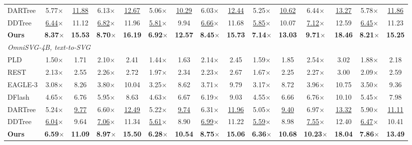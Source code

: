 \begin{table}[t]
\begin{tabular*}{\textwidth}{@{\extracolsep{\fill}}l*{14}{c}@{}}
DARTree & 5.77$\times$ & \underline{11.88} & 6.13$\times$ & \underline{12.67} & 5.06$\times$ & \underline{10.29} & 6.03$\times$ & \underline{12.44} & 5.25$\times$ & \underline{10.62} & 6.44$\times$ & \underline{13.27} & 5.78$\times$ & \underline{11.86} \\
DDTree & \underline{6.44}$\times$ & 11.12 & \underline{6.82}$\times$ & 11.96 & \underline{5.81}$\times$ & 9.94 & \underline{6.66}$\times$ & 11.68 & \underline{5.85}$\times$ & 10.07 & \underline{7.12}$\times$ & 12.59 & \underline{6.45}$\times$ & 11.23 \\
\textbf{Ours} & \textbf{8.37}$\times$ & \textbf{15.53} & \textbf{8.70}$\times$ & \textbf{16.19} & \textbf{6.92}$\times$ & \textbf{12.57} & \textbf{8.45}$\times$ & \textbf{15.73} & \textbf{7.14}$\times$ & \textbf{13.03} & \textbf{9.71}$\times$ & \textbf{18.46} & \textbf{8.21}$\times$ & \textbf{15.25} \\
\midrule
\multicolumn{15}{l}{\textit{OmniSVG-4B, text-to-SVG}} \\
PLD & 1.50$\times$ & 1.71 & 2.10$\times$ & 2.41 & 1.44$\times$ & 1.63 & 2.14$\times$ & 2.45 & 1.59$\times$ & 1.85 & 2.54$\times$ & 3.02 & 1.88$\times$ & 2.18 \\
REST & 2.13$\times$ & 2.55 & 2.26$\times$ & 2.72 & 1.97$\times$ & 2.34 & 2.23$\times$ & 2.67 & 1.67$\times$ & 2.25 & 2.27$\times$ & 3.00 & 2.09$\times$ & 2.59 \\
EAGLE-3 & 3.08$\times$ & 8.26 & 3.80$\times$ & 10.04 & 3.25$\times$ & 8.62 & 3.71$\times$ & 9.79 & 3.17$\times$ & 8.72 & 3.96$\times$ & 10.75 & 3.50$\times$ & 9.36 \\
DFlash & 4.65$\times$ & 6.76 & 5.95$\times$ & 8.63 & 4.63$\times$ & 6.67 & 6.19$\times$ & 9.03 & 4.55$\times$ & 6.66 & 6.76$\times$ & 10.10 & 5.45$\times$ & 7.98 \\
DARTree & 5.24$\times$ & \underline{9.77} & 6.60$\times$ & \underline{12.49} & 5.22$\times$ & \underline{9.74} & 6.31$\times$ & \underline{11.96} & 5.05$\times$ & \underline{9.40} & 6.97$\times$ & \underline{13.32} & 5.90$\times$ & \underline{11.11} \\
DDTree & \underline{6.04}$\times$ & 9.64 & \underline{7.06}$\times$ & 11.34 & \underline{5.61}$\times$ & 8.90 & \underline{6.99}$\times$ & 11.22 & \underline{5.59}$\times$ & 8.98 & \underline{7.55}$\times$ & 12.40 & \underline{6.47}$\times$ & 10.41 \\
\textbf{Ours} & \textbf{6.59}$\times$ & \textbf{11.09} & \textbf{8.97}$\times$ & \textbf{15.50} & \textbf{6.28}$\times$ & \textbf{10.54} & \textbf{8.75}$\times$ & \textbf{15.06} & \textbf{6.36}$\times$ & \textbf{10.68} & \textbf{10.23}$\times$ & \textbf{18.04} & \textbf{7.86}$\times$ & \textbf{13.49} \\

\end{tabular*}
\end{table}
